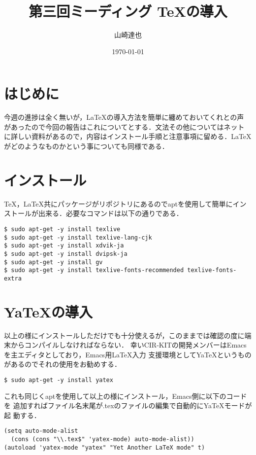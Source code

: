 \documentclass[12pt,a4j]{jarticle}
\title{第三回ミーディング TeXの導入}
\author{山崎達也}
\date{\today}
\begin{document}
\maketitle
\section{はじめに}
今週の進捗は全く無いが，\LaTeX の導入方法を簡単に纏めておいてくれとの声
があったので今回の報告はこれについてとする．文法その他についてはネット
に詳しい資料があるので，内容はインストール手順と注意事項に留める．\LaTeX
がどのようなものかという事についても同様である．
 
\section{インストール}
\TeX ，\LaTeX 共にパッケージがリポジトリにあるのでaptを使用して簡単にイン
ストールが出来る．必要なコマンドは以下の通りである．

{
\small
\begin{verbatim}
$ sudo apt-get -y install texlive
$ sudo apt-get -y install texlive-lang-cjk
$ sudo apt-get -y install xdvik-ja
$ sudo apt-get -y install dvipsk-ja
$ sudo apt-get -y install gv
$ sudo apt-get -y install texlive-fonts-recommended texlive-fonts-extra
\end{verbatim}
}

\section{YaTeXの導入}
以上の様にインストールしただけでも十分使えるが，このままでは確認の度に端
末からコンパイルしなければならない．
幸いCIR-KITの開発メンバーはEmacsを主エディタとしており，Emacs用\LaTeX 入力
支援環境としてYaTeXというものがあるのでそれの使用をお勧めする．

{
\small
\begin{verbatim}
$ sudo apt-get -y install yatex
\end{verbatim}
}

これも同じくaptを使用して以上の様にインストール，Emacs側に以下のコードを
追加すればファイル名末尾が.texのファイルの編集で自動的にYaTeXモードが起
動する．

{
\small
\begin{verbatim}
(setq auto-mode-alist
  (cons (cons "\\.tex$" 'yatex-mode) auto-mode-alist))
(autoload 'yatex-mode "yatex" "Yet Another LaTeX mode" t)
\end{verbatim}
}
\end{document}
